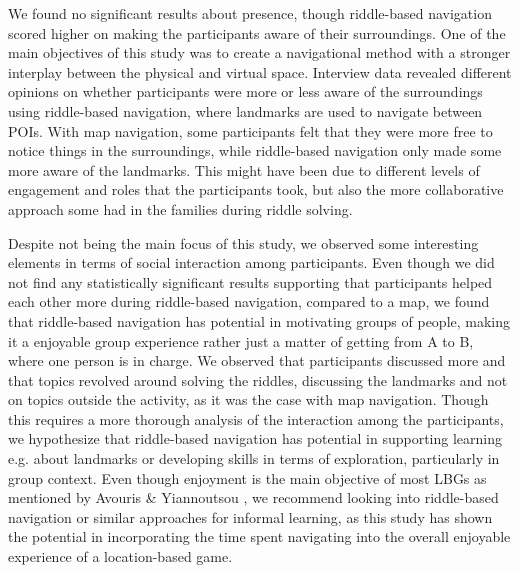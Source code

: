 We found no significant results about presence, though riddle-based navigation scored higher on making the participants aware of their surroundings. One of the main objectives of this study was to create a navigational method with a stronger interplay between the physical and virtual space. Interview data revealed different opinions on whether participants were more or less aware of the surroundings using riddle-based navigation, where landmarks are used to navigate between POIs. With map navigation, some participants felt that they were more free to notice things in the surroundings, while riddle-based navigation only made some more aware of the landmarks. This might have been due to different levels of engagement and roles that the participants took, but also the more collaborative approach some had in the families during riddle solving.   


Despite not being the main focus of this study, we observed some interesting elements in terms of social interaction among participants. Even though we did not find any statistically significant results supporting that participants helped each other more during riddle-based navigation, compared to a map, we found that riddle-based navigation has potential in motivating groups of people, making it a enjoyable group experience rather just a matter of getting from A to B, where one person is in charge. We observed that participants discussed more and that topics revolved around solving the riddles, discussing the landmarks and not on topics outside the activity, as it was the case with map navigation. Though this requires a more thorough analysis of the interaction among the participants, we hypothesize that riddle-based navigation has potential in supporting learning e.g. about landmarks or developing skills in terms of exploration, particularly in group context. Even though enjoyment is the main objective of most LBGs as mentioned by Avouris \& Yiannoutsou \cite{LBG_Review}, we recommend looking into riddle-based navigation or similar approaches for informal learning, as this study has shown the potential in incorporating the time spent navigating into the overall enjoyable experience of a location-based game. 


